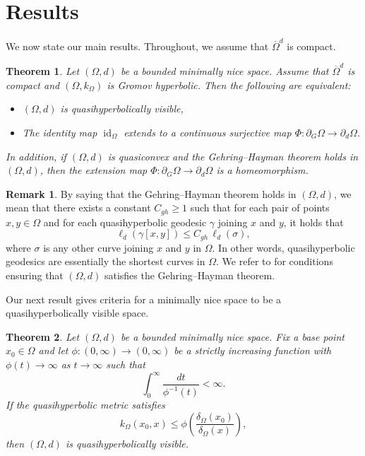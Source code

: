 \documentclass[a4paper,12pt]{amsart}
\newtheorem{thm}{Theorem}[section]
\theoremstyle{definition}
\newtheorem{rem}{Remark}[section]
\begin{document}
\section{Results}
We now state our main results. Throughout, we assume that $\overline{\Omega}^d$ is compact.

\begin{thm}\label{Main-1}
	Let $(\Omega,d)$ be a bounded minimally nice space. Assume that $\overline{\Omega}^d$ is compact and $(\Omega,k_{\Omega})$ is Gromov hyperbolic. Then the following are equivalent:
	\begin{itemize}
		\item[(i)] $(\Omega,d)$ is quasihyperbolically visible,
		\item[(ii)] The identity map $\operatorname{id}_{\Omega}$ extends to a continuous surjective map $\Phi:\partial_{G}\Omega\to \partial_d\Omega$.
	\end{itemize}
	In addition, if $(\Omega,d)$ is quasiconvex and the Gehring--Hayman theorem holds in $(\Omega,d)$, then the extension map $\Phi:\partial_{G}\Omega\to \partial_d\Omega$ is a homeomorphism.
\end{thm}

\begin{rem}
	By saying that the Gehring--Hayman theorem holds in $(\Omega,d)$, we mean that there exists a constant $C_{gh} \geq 1$ such that for each pair of points $x,y \in \Omega$ and for each quasihyperbolic geodesic $\gamma$ joining $x$ and $y$, it holds that
	$$\ell_d(\gamma[x,y]) \leq C_{gh}\,\ell_d(\sigma),$$
	where $\sigma$ is any other curve joining $x$ and $y$ in $\Omega$. In other words, quasihyperbolic geodesics are essentially the shortest curves in $\Omega$. We refer to \cite{Koskela-2013,Koskela-2014} for conditions ensuring that $(\Omega,d)$ satisfies the Gehring--Hayman theorem.
\end{rem}

Our next result gives criteria for a minimally nice space to be a quasihyperbolically visible space.

\begin{thm}\label{Main-2}
	Let $(\Omega,d)$ be a bounded minimally nice space. Fix a base point $x_0\in \Omega$ and let $\phi:(0,\infty)\to(0,\infty)$ be a strictly increasing function with $\phi(t)\to \infty$ as $t\to \infty$ such that
	\begin{equation}\label{Int}
		\int_{0}^{\infty}\frac{dt}{\phi^{-1}(t)}<\infty.
	\end{equation}
	If the quasihyperbolic metric satisfies
	\begin{equation}\label{Growth}
		k_{\Omega}(x_0,x)\le \phi\left(\frac{\delta_{\Omega}(x_0)}{\delta_{\Omega}(x)}\right),
	\end{equation}
	then $(\Omega,d)$ is quasihyperbolically visible.
\end{thm}
\end{document}
